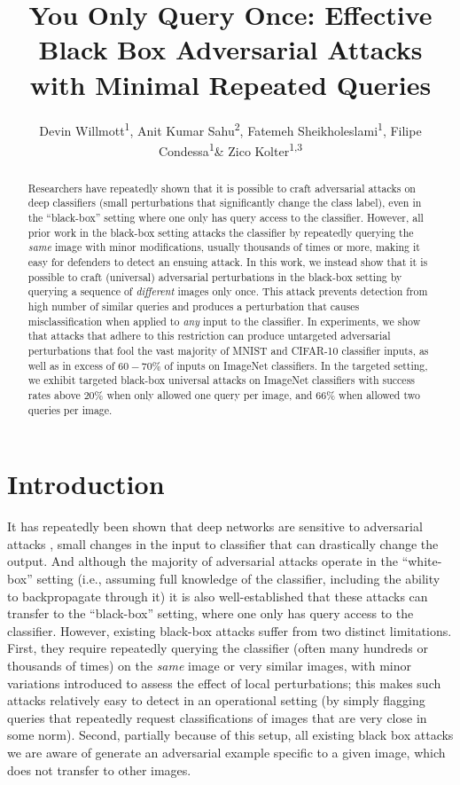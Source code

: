 \documentclass[letterpaper]{article}
\title{You Only Query Once: Effective Black Box Adversarial Attacks with Minimal Repeated Queries}
\author{
	Devin Willmott\textsuperscript{\rm 1},
	Anit Kumar Sahu\textsuperscript{\rm 2},
	Fatemeh Sheikholeslami\textsuperscript{\rm 1},
	Filipe Condessa\textsuperscript{\rm 1}\&
	Zico Kolter\textsuperscript{\rm 1,3}
}
\begin{document}
	\maketitle
	\begin{abstract}
		Researchers have repeatedly shown that it is possible to craft adversarial attacks on deep classifiers (small perturbations that significantly change the class label), even in the ``black-box'' setting where one only has query access to the classifier.  However, all prior work in the black-box setting attacks the classifier by repeatedly querying the \emph{same} image with minor modifications, usually thousands of times or more, making it easy for defenders to detect an ensuing attack.  In this work, we instead show that it is possible to craft (universal) adversarial perturbations in the black-box setting by querying a sequence of \emph{different} images only once. This attack prevents detection from high number of similar queries and produces a perturbation that causes misclassification when applied to \emph{any} input to the classifier. In experiments, we show that attacks that adhere to this restriction can produce untargeted adversarial perturbations that fool the vast majority of MNIST and CIFAR-10 classifier inputs, as well as in excess of $60-70\%$ of inputs on ImageNet classifiers. In the targeted setting, we exhibit targeted black-box universal attacks on ImageNet classifiers with success rates above $20\%$ when only allowed one query per image, and $66\%$ when allowed two queries per image.
	\end{abstract}
	
	\section{Introduction}
	
	It has repeatedly been shown that deep networks are sensitive to adversarial attacks \cite{goodfellow2014explaining,autozoom,carlini2017,zoo}, small changes in the input to classifier that can drastically change the output.  And although the majority of adversarial attacks operate in the ``white-box'' setting (i.e., assuming full knowledge of the classifier, including the ability to backpropagate through it) it is also well-established that these attacks can transfer to the ``black-box'' setting, where one only has query access to the classifier.  However, existing black-box attacks suffer from two distinct limitations.  First, they require repeatedly querying the classifier (often many hundreds or thousands of times) on the \emph{same} image or very similar images, with minor variations introduced to assess the effect of local perturbations; this makes such attacks relatively easy to detect in an operational setting (by simply flagging queries that repeatedly request classifications of images that are very close in some norm).  Second, partially because of this setup, all existing black box attacks we are aware of generate an adversarial example specific to a given image, which does not transfer to other images.
	
\end{document}

